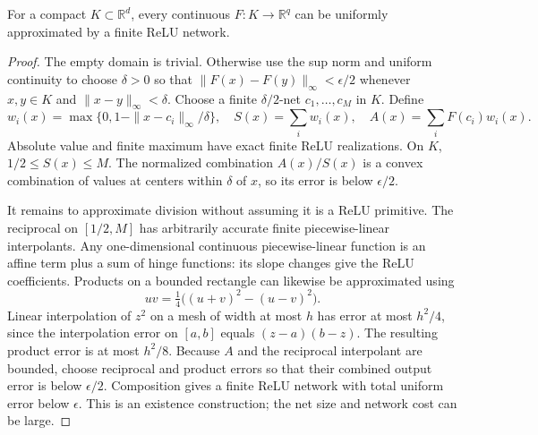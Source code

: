 \begin{lemma}
For a compact $K\subset\mathbb R^d$, every continuous $F:K\to\mathbb R^q$ can be uniformly approximated by a finite ReLU network.
\end{lemma}
\begin{proof}
The empty domain is trivial. Otherwise use the sup norm and uniform continuity to choose $\delta>0$ so that $\|F(x)-F(y)\|_\infty<\epsilon/2$ whenever $x,y\in K$ and $\|x-y\|_\infty<\delta$. Choose a finite $\delta/2$-net $c_1,\ldots,c_M$ in $K$. Define
\[
 w_i(x)=\max\{0,1-\|x-c_i\|_\infty/\delta\},\quad
 S(x)=\sum_iw_i(x),\quad A(x)=\sum_iF(c_i)w_i(x).
\]
Absolute value and finite maximum have exact finite ReLU realizations. On $K$, $1/2\le S(x)\le M$. The normalized combination $A(x)/S(x)$ is a convex combination of values at centers within $\delta$ of $x$, so its error is below $\epsilon/2$.

It remains to approximate division without assuming it is a ReLU primitive. The reciprocal on $[1/2,M]$ has arbitrarily accurate finite piecewise-linear interpolants. Any one-dimensional continuous piecewise-linear function is an affine term plus a sum of hinge functions: its slope changes give the ReLU coefficients. Products on a bounded rectangle can likewise be approximated using
\[
 uv=\tfrac14\bigl((u+v)^2-(u-v)^2\bigr).
\]
Linear interpolation of $z^2$ on a mesh of width at most $h$ has error at most $h^2/4$, since the interpolation error on $[a,b]$ equals $(z-a)(b-z)$. The resulting product error is at most $h^2/8$. Because $A$ and the reciprocal interpolant are bounded, choose reciprocal and product errors so that their combined output error is below $\epsilon/2$. Composition gives a finite ReLU network with total uniform error below $\epsilon$. This is an existence construction; the net size and network cost can be large.
\end{proof}

